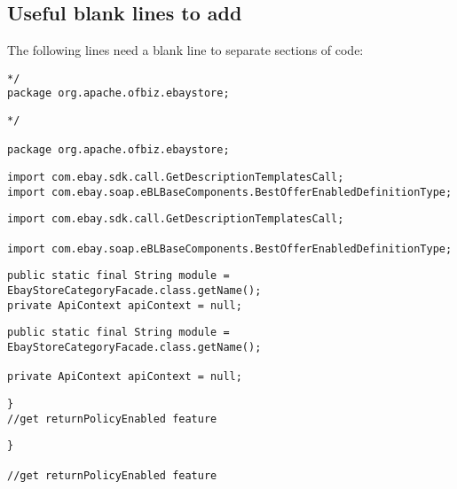 \subsection{Useful blank lines to add}
The following lines need a blank line to separate sections of code:
\begin{lstlisting}[firstnumber=18, caption={Lines 18-19 violation of the rule}]
*/
package org.apache.ofbiz.ebaystore;
\end{lstlisting}
\begin{lstlisting}[firstnumber=18, caption={Lines 18-19 possible solution}]
*/

package org.apache.ofbiz.ebaystore;
\end{lstlisting}
\noindent\makebox[\linewidth]{\rule{\linewidth}{0.4pt}}
\begin{lstlisting}[firstnumber=37, caption={Lines 37-38 violation of the rule}]
import com.ebay.sdk.call.GetDescriptionTemplatesCall;
import com.ebay.soap.eBLBaseComponents.BestOfferEnabledDefinitionType;
\end{lstlisting}
\begin{lstlisting}[firstnumber=37, caption={Lines 37-38 possible solution}]
import com.ebay.sdk.call.GetDescriptionTemplatesCall;

import com.ebay.soap.eBLBaseComponents.BestOfferEnabledDefinitionType;
\end{lstlisting}
\noindent\makebox[\linewidth]{\rule{\linewidth}{0.4pt}}
\begin{lstlisting}[firstnumber=58, caption={Lines 58-59 violation of the rule}]
public static final String module = EbayStoreCategoryFacade.class.getName();
private ApiContext apiContext = null;
\end{lstlisting}
\begin{lstlisting}[firstnumber=58, caption={Lines 58-59 possible solution}]
public static final String module = EbayStoreCategoryFacade.class.getName();

private ApiContext apiContext = null;
\end{lstlisting}
\noindent\makebox[\linewidth]{\rule{\linewidth}{0.4pt}}
\begin{lstlisting}[firstnumber=122, caption={Lines 122-123 violation of the rule}]
}
//get returnPolicyEnabled feature
\end{lstlisting}
\begin{lstlisting}[firstnumber=122, caption={Lines 122-123 possible solution}]
}

//get returnPolicyEnabled feature
\end{lstlisting}
